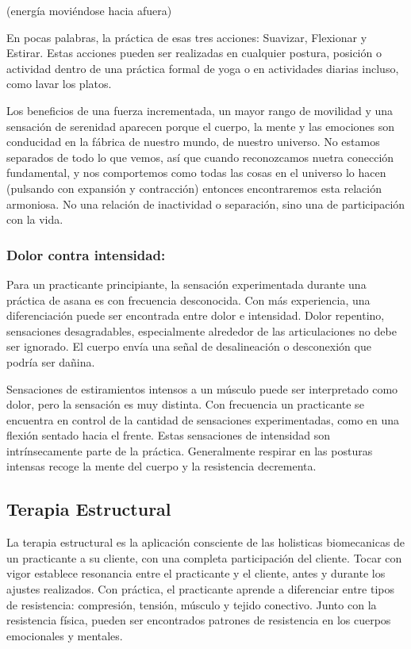 (energía movi\'endose hacia afuera)

En pocas palabras, la práctica de esas tres acciones: Suavizar, Flexionar y Estirar. Estas acciones pueden ser realizadas en cualquier postura, posición o actividad dentro de una práctica formal de yoga o en actividades diarias incluso, como lavar los platos.

Los beneficios de una fuerza incrementada, un mayor rango de movilidad y una sensación de serenidad aparecen porque el cuerpo, la mente y las emociones son conducidad en la fábrica de nuestro mundo, de nuestro universo. No estamos separados de todo lo que vemos, así que cuando reconozcamos nuetra conección fundamental, y nos comportemos como todas las cosas en el universo lo hacen (pulsando con expansión y contracción) entonces encontraremos esta relación armoniosa. No una relación de inactividad o separación, sino una de participación con la vida.

\subsubsection{Dolor contra intensidad:}
Para un practicante principiante, la sensación experimentada durante una práctica de asana es con frecuencia desconocida. Con más experiencia, una diferenciación puede ser encontrada entre dolor e intensidad. Dolor repentino, sensaciones desagradables, especialmente alrededor de las articulaciones no debe ser ignorado. El cuerpo envía una señal de desalineación o desconexión que podría ser dañina.

Sensaciones de estiramientos intensos a un músculo puede ser interpretado como dolor, pero la sensación es muy distinta. Con frecuencia un practicante se encuentra en control de la cantidad de sensaciones experimentadas, como en una flexión sentado hacia el frente. Estas sensaciones de intensidad son intrínsecamente parte de la práctica. Generalmente respirar en las posturas intensas recoge la mente del cuerpo y la resistencia decrementa.

\subsection{Terapia Estructural}

La terapia estructural es la aplicación consciente de las holisticas biomecanicas de un practicante a su cliente, con una completa participación del cliente. Tocar con vigor establece resonancia entre el practicante y el cliente, antes y durante los ajustes realizados. Con práctica, el practicante aprende a diferenciar entre tipos de resistencia: compresión, tensión, músculo y tejido conectivo. Junto con la resistencia física, pueden ser encontrados patrones de resistencia en los cuerpos emocionales y mentales.

